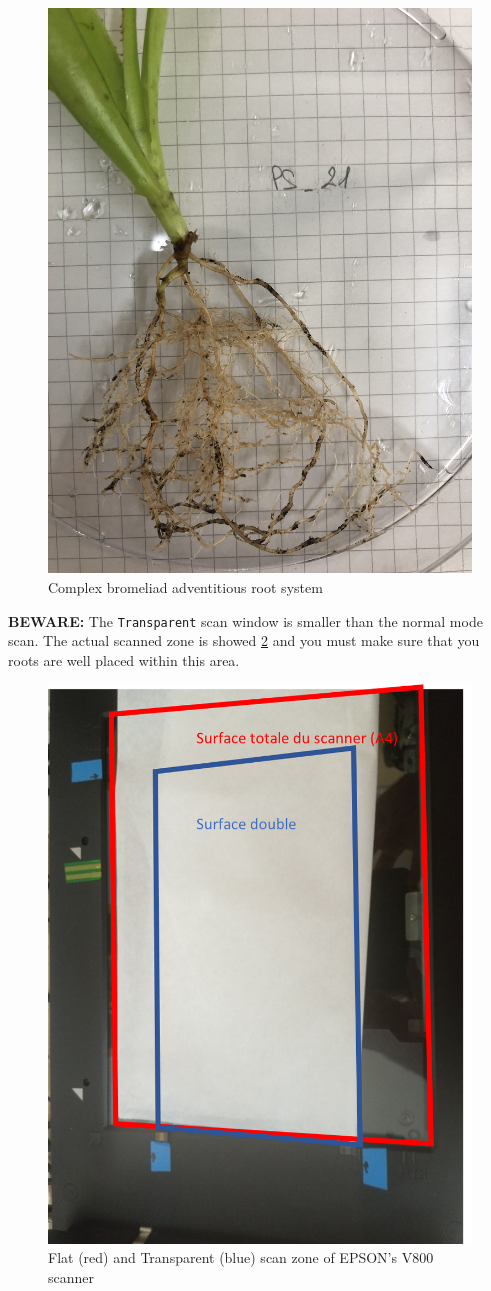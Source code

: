 \documentclass[
  12pt,
  american,
  a4paper,
  extrafontsizes,onecolumn,openright
  ]{memoir}
\begin{document}
\scriptsize

\begin{figure}

{\centering \includegraphics[width=0.5\linewidth]{document/trait/rootmorpho/bromeroot} 

}

\caption{Complex bromeliad adventitious root system}\label{fig:bromeroot}
\end{figure}

\normalsize

\textbf{BEWARE:} The \texttt{Transparent} scan window is smaller than the normal mode scan. The actual scanned zone is showed \ref{fig:scantransp} and you must make sure that you roots are well placed within this area.

\scriptsize

\begin{figure}

{\centering \includegraphics[width=0.5\linewidth]{document/trait/rootmorpho/scan_transp} 

}

\caption{Flat (red) and Transparent (blue) scan zone of EPSON's V800 scanner}\label{fig:scantransp}
\end{figure}
\end{document}
